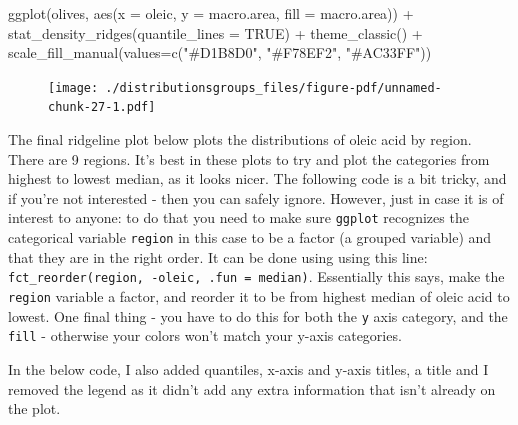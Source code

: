 \documentclass[
  letterpaper,
  DIV=11,
  numbers=noendperiod]{scrreprt}
\newenvironment{Shaded}{\begin{snugshade}}{\end{snugshade}}
\newcommand{\AttributeTok}[1]{\textcolor[rgb]{0.40,0.45,0.13}{#1}}
\newcommand{\ConstantTok}[1]{\textcolor[rgb]{0.56,0.35,0.01}{#1}}
\newcommand{\FunctionTok}[1]{\textcolor[rgb]{0.28,0.35,0.67}{#1}}
\newcommand{\NormalTok}[1]{\textcolor[rgb]{0.00,0.23,0.31}{#1}}
\newcommand{\SpecialCharTok}[1]{\textcolor[rgb]{0.37,0.37,0.37}{#1}}
\newcommand{\StringTok}[1]{\textcolor[rgb]{0.13,0.47,0.30}{#1}}
\begin{document}
\begin{Shaded}
\begin{Highlighting}[]
\FunctionTok{ggplot}\NormalTok{(olives, }\FunctionTok{aes}\NormalTok{(}\AttributeTok{x =}\NormalTok{ oleic, }\AttributeTok{y =}\NormalTok{ macro.area, }\AttributeTok{fill =}\NormalTok{ macro.area)) }\SpecialCharTok{+}
  \FunctionTok{stat\_density\_ridges}\NormalTok{(}\AttributeTok{quantile\_lines =} \ConstantTok{TRUE}\NormalTok{) }\SpecialCharTok{+}
  \FunctionTok{theme\_classic}\NormalTok{() }\SpecialCharTok{+}
  \FunctionTok{scale\_fill\_manual}\NormalTok{(}\AttributeTok{values=}\FunctionTok{c}\NormalTok{(}\StringTok{"\#D1B8D0"}\NormalTok{, }\StringTok{"\#F78EF2"}\NormalTok{, }\StringTok{"\#AC33FF"}\NormalTok{))}
\end{Highlighting}
\end{Shaded}

\begin{figure}[H]

{\centering \texttt{[image: ./distributionsgroups\_files/figure-pdf/unnamed-chunk-27-1.pdf]}

}

\end{figure}

The final ridgeline plot below plots the distributions of oleic acid by
region. There are 9 regions. It's best in these plots to try and plot
the categories from highest to lowest median, as it looks nicer. The
following code is a bit tricky, and if you're not interested - then you
can safely ignore. However, just in case it is of interest to anyone: to
do that you need to make sure \texttt{ggplot} recognizes the categorical
variable \texttt{region} in this case to be a factor (a grouped
variable) and that they are in the right order. It can be done using
using this line:
\texttt{fct\_reorder(region,\ -oleic,\ .fun\ =\ median)}. Essentially
this says, make the \texttt{region} variable a factor, and reorder it to
be from highest median of oleic acid to lowest. One final thing - you
have to do this for both the \texttt{y} axis category, and the
\texttt{fill} - otherwise your colors won't match your y-axis
categories.

In the below code, I also added quantiles, x-axis and y-axis titles, a
title and I removed the legend as it didn't add any extra information
that isn't already on the plot.
\end{document}
